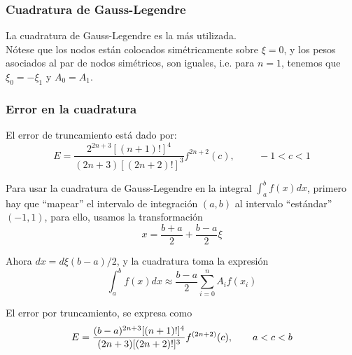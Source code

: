 \begin{frame}
\frametitle{Cuadratura de Gauss-Legendre}
La cuadratura de Gauss-Legendre es la más utilizada. 
\\
\bigskip
Nótese que los nodos están colocados simétricamente sobre $\xi=0$, y los pesos asociados al par de nodos simétricos, son iguales, i.e. para $n=1$, tenemos que $\xi_{0} = - \xi_{1}$ y $A_{0} = A_{1}$.
\end{frame}
\begin{frame}
\frametitle{Error en la cuadratura}
El error de truncamiento está dado por:
\[ E = \dfrac{2^{2n+3} [(n+1)!]^{4}}{(2n+3)[(2n+2)!]^{3}} f^{2n+2} (c), \hspace{1cm} -1 < c < 1 \]
\end{frame}
\begin{frame}
Para usar la cuadratura de Gauss-Legendre en la integral $\int_{a}^{b} f(x) dx$, primero hay que \enquote{mapear} el intervalo de integración $(a,b)$ al intervalo \enquote{estándar} $(-1,1)$, para ello, usamos la transformación
\[ x = \dfrac{b+a}{2} + \dfrac{b-a}{2} \xi \]
\end{frame}
\begin{frame}
Ahora $dx = d \xi (b-a)/2$, y la cuadratura toma la expresión
\[ \int_{a}^{b} f(x) dx \approx \dfrac{b-a}{2} \sum_{i=0}^{n} A_{i} f(x_{i}) \]
\end{frame}
\begin{frame}
El error por truncamiento, se expresa como
\[ E = \dfrac{(b-a)^{2n+3} [(n+1)!]^{4}}{(2n+3)[(2n+2)!]^{3}} f^{(2n+2)} (c), \hspace{0.7cm} a<c<b \]
\end{frame}
